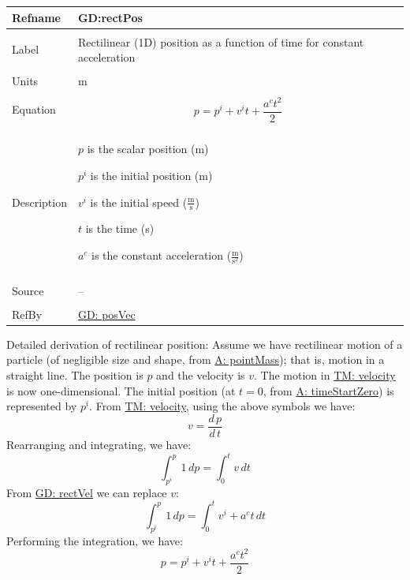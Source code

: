 \documentclass[12pt]{article}
\begin{document}
\noindent \begin{minipage}{\textwidth}
\begin{tabular}{p{} p{}}
\toprule \textbf{Refname} & \textbf{GD:rectPos}
\label{GD:rectPos}
\\ \midrule \\
Label & Rectilinear (1D) position as a function of time for constant acceleration
\\ \midrule \\
Units & m
\\ \midrule \\
Equation & \begin{displaymath}
           p={p^{i}}+{v^{i}} t+\frac{{a^{c}} t^{2}}{2}
           \end{displaymath}
\\ \midrule \\
Description & \begin{symbDescription}
              \item{$p$ is the scalar position (m)}
              \item{${p^{i}}$ is the initial position (m)}
              \item{${v^{i}}$ is the initial speed ($\frac{\text{m}}{\text{s}}$)}
              \item{$t$ is the time (s)}
              \item{${a^{c}}$ is the constant acceleration ($\frac{\text{m}}{\text{s}^{2}}$)}
              \end{symbDescription}
\\ \midrule \\
Source & --
\\ \midrule \\
RefBy & \hyperref[GD:posVec]{GD: posVec}
\\ \bottomrule \end{tabular}
\end{minipage}
Detailed derivation of rectilinear position:
Assume we have rectilinear motion of a particle (of negligible size and shape, from \hyperref[pointMass]{A: pointMass}); that is, motion in a straight line. The position is $p$ and the velocity is $v$. The motion in \hyperref[TM:velocity]{TM: velocity} is now one-dimensional. The initial position (at $t=0$, from \hyperref[timeStartZero]{A: timeStartZero}) is represented by ${p^{i}}$. From \hyperref[TM:velocity]{TM: velocity}, using the above symbols we have:
\begin{displaymath}
v=\frac{d\,p}{d\,t}
\end{displaymath}
Rearranging and integrating, we have:
\begin{displaymath}
\int_{{p^{i}}}^{p}{1}\,dp=\int_{0}^{t}{v}\,dt
\end{displaymath}
From \hyperref[GD:rectVel]{GD: rectVel} we can replace $v$:
\begin{displaymath}
\int_{{p^{i}}}^{p}{1}\,dp=\int_{0}^{t}{{v^{i}}+{a^{c}} t}\,dt
\end{displaymath}
Performing the integration, we have:
\begin{displaymath}
p={p^{i}}+{v^{i}} t+\frac{{a^{c}} t^{2}}{2}
\end{displaymath}
\par~
\end{document}
